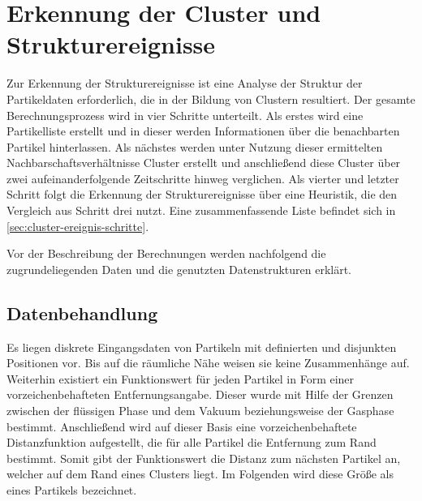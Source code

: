 




\chapter{Erkennung der Cluster und Strukturereignisse}\label{sec:cluster-ereignisse}

Zur Erkennung der Strukturereignisse ist eine Analyse der Struktur der Partikeldaten erforderlich, die in der Bildung von Clustern resultiert. Der gesamte Berechnungsprozess wird in vier Schritte unterteilt. Als erstes wird eine Partikelliste erstellt und in dieser werden Informationen über die benachbarten Partikel hinterlassen. Als nächstes werden unter Nutzung dieser ermittelten Nachbarschaftsverhältnisse Cluster erstellt und anschließend diese Cluster über zwei aufeinanderfolgende Zeitschritte hinweg verglichen. Als vierter und letzter Schritt folgt die Erkennung der Strukturereignisse über eine Heuristik, die den Vergleich aus Schritt drei nutzt. Eine zusammenfassende Liste befindet sich in \autoref{sec:cluster-ereignis-schritte}.

Vor der Beschreibung der Berechnungen werden nachfolgend die zugrundeliegenden Daten und die genutzten Datenstrukturen erklärt.

\section{Datenbehandlung}\label{sec:datenbehandlung}


Es liegen diskrete Eingangsdaten von Partikeln mit definierten und disjunkten Positionen vor. Bis auf die räumliche Nähe weisen sie keine Zusammenhänge auf. Weiterhin existiert ein Funktionswert für jeden Partikel in Form einer vorzeichenbehafteten Entfernungsangabe. Dieser wurde mit Hilfe der Grenzen zwischen der flüssigen Phase und dem Vakuum beziehungsweise der Gasphase bestimmt. Anschließend wird auf dieser Basis eine vorzeichenbehaftete Distanzfunktion aufgestellt, die für alle Partikel die Entfernung zum Rand bestimmt. Somit gibt der Funktionswert die Distanz zum nächsten Partikel an, welcher auf dem Rand eines Clusters liegt. Im Folgenden wird diese Größe als  eines Partikels bezeichnet.

